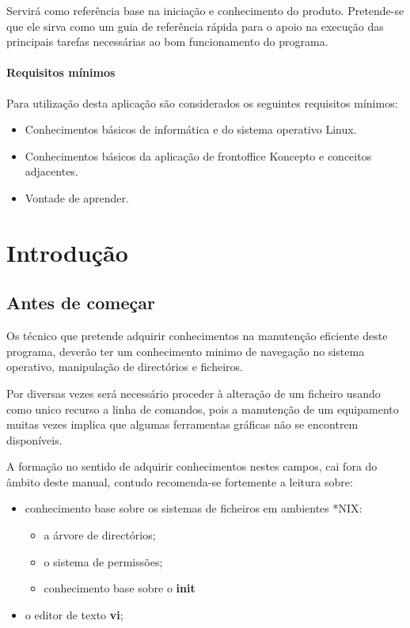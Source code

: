 \documentclass[a4paper,11pt,openany]{memoir}
\begin{document}
Servirá como referência base na iniciação e conhecimento do produto. Pretende-se
que ele sirva como um guia de referência rápida para o apoio na execução das
principais tarefas necessárias ao bom funcionamento do programa.



\subsection{Requisitos mínimos}

Para utilização desta aplicação são considerados os seguintes requisitos mínimos:
\begin{itemize}
\item Conhecimentos básicos de informática e do sistema operativo Linux.
\item Conhecimentos básicos da aplicação de frontoffice Koncepto e conceitos adjacentes.
\item Vontade de aprender.
\end{itemize}






\newpage
\part{Introdução}

\chapter{Antes de começar}

Os técnico que pretende adquirir conhecimentos na manutenção eficiente deste programa, 
deverão ter um conhecimento minimo de navegação no sistema operativo, manipulação de directórios e ficheiros.

Por diversas vezes será necessário proceder à alteração de um ficheiro usando como unico recurso a linha de comandos, 
pois a manutenção de um equipamento muitas vezes implica que algumas ferramentas gráficas não se encontrem disponíveis.

A formação no sentido de adquirir conhecimentos nestes campos, cai fora do âmbito deste manual, contudo recomenda-se fortemente 
a leitura sobre:
\begin{itemize}
\item conhecimento base sobre os sistemas de ficheiros em ambientes *NIX:
\begin{itemize}
\item a árvore de directórios;
\item o sistema de permissões;
\item conhecimento base sobre o \textbf{init}
\end{itemize}
\item o editor de texto \textbf{vi};
\end{itemize}
\end{document}
